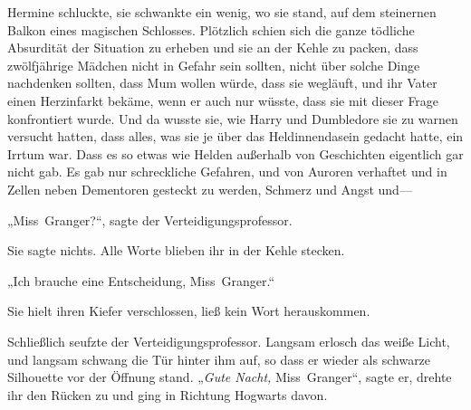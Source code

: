 Hermine schluckte, sie schwankte ein wenig, wo sie stand, auf dem steinernen Balkon eines magischen Schlosses. Plötzlich schien sich die ganze tödliche Absurdität der Situation zu erheben und sie an der Kehle zu packen, dass zwölfjährige Mädchen nicht in Gefahr sein sollten, nicht über solche Dinge nachdenken sollten, dass Mum wollen würde, dass sie wegläuft, und ihr Vater einen Herzinfarkt bekäme, wenn er auch nur wüsste, dass sie mit dieser Frage konfrontiert wurde.
%
Und da wusste sie, wie Harry und Dumbledore sie zu warnen versucht hatten, dass alles, was sie je über das Heldinnendasein gedacht hatte, ein Irrtum war. Dass es so etwas wie Helden außerhalb von Geschichten eigentlich gar nicht gab. Es gab nur schreckliche Gefahren, und von Auroren verhaftet und in Zellen neben Dementoren gesteckt zu werden, Schmerz und Angst und—

„Miss~Granger?“, sagte der Verteidigungsprofessor.

Sie sagte nichts. Alle Worte blieben ihr in der Kehle stecken.

„Ich brauche eine Entscheidung, Miss~Granger.“

Sie hielt ihren Kiefer verschlossen, ließ kein Wort herauskommen.

Schließlich seufzte der Verteidigungsprofessor. Langsam erlosch das weiße Licht, und langsam schwang die Tür hinter ihm auf, so dass er wieder als schwarze Silhouette vor der Öffnung stand.
„\emph{Gute Nacht,} Miss~Granger“, sagte er, drehte ihr den Rücken zu und ging in Richtung Hogwarts davon.

